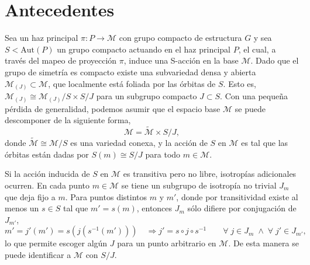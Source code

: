 \section{Antecedentes}

Sea un haz principal $\pi: P \longrightarrow \mathcal{M}$ con grupo compacto de estructura $G$ y sea $S < \mathrm{Aut}(P)$ un grupo compacto actuando en el haz principal $P$, el cual, a trav\'{e}s del mapeo de proyecci\'{o}n $\pi$, induce una S-acci\'{o}n en la base $\mathcal{M}$. Dado que el grupo de simetr\'{i}a es compacto existe una subvariedad densa y abierta $\mathcal{M}_{(J)} \subset \mathcal{M}$, que localmente est\'{a} foliada por las \'{o}rbitas de $S$. Esto es, $\mathcal{M}_{(J)} \cong  \mathcal{M}_{(J)}/S \times S/J$ para un subgrupo compacto $J \subset S$. Con una peque\~{n}a p\'{e}rdida de generalidad, podemos asumir que el espacio base $\mathcal{M}$ se puede descomponer de la siguiente forma, $$\mathcal{M} = \mathcal{\tilde{M}} \times S/J,$$ donde $\mathcal{\tilde{M}} \cong \mathcal{M}/S$ es una variedad conexa, y la acci\'{o}n de $S$ en $\mathcal{M}$ es tal que las \'{o}rbitas est\'{a}n dadas por $S(m) \cong S/J$ para todo $m \in \mathcal{M}$.

Si la acci\'{o}n inducida de $S$ en $\mathcal{M}$ es transitiva pero no libre, isotrop\'{i}as adicionales ocurren. En cada punto $m \in \mathcal{M}$ se tiene un subgrupo de isotrop\'{i}a no trivial $J_{m}$ que deja fijo a $m$. Para puntos distintos $m$ y $m'$, donde por transitividad existe al menos un $s \in S$ tal que $m' = s(m)$, entonces $J_{m}$ s\'{o}lo difiere por conjugaci\'{o}n de $J_{m'}$,
%
\begin{equation*}
m' = j'(m') = s ( j ( s^{-1} (m') ) )  \quad \Longrightarrow j' = s \circ j \circ s^{-1} \qquad \forall \; j \in J_{m} \; \land \; \forall \; j' \in J_{m'},
\end{equation*}
%
lo que permite escoger alg\'{u}n $J$ para un punto arbitrario en $\mathcal{M}$. De esta manera se puede identificar a $\mathcal{M}$ con $S/J$.

